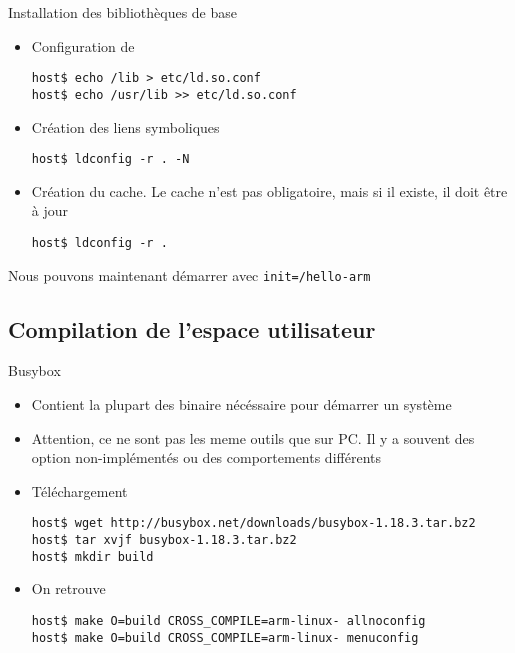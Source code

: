 \begin{frame}[fragile=singleslide]{Installation des bibliothèques de base}
  \begin{itemize}
  \item Configuration de 
    \begin{lstlisting}
host$ echo /lib > etc/ld.so.conf
host$ echo /usr/lib >> etc/ld.so.conf
    \end{lstlisting}
  \item Création des liens symboliques
    \begin{lstlisting}
host$ ldconfig -r . -N
    \end{lstlisting}
  \item Création du cache. Le  cache n'est pas obligatoire, mais si il
    existe, il doit être à jour
    \begin{lstlisting}
host$ ldconfig -r .
    \end{lstlisting}
  \end{itemize}
  Nous pouvons maintenant démarrer avec \verb+init=/hello-arm+
\end{frame}

\subsection{Compilation de l'espace utilisateur}

\begin{frame}[fragile=singleslide]{Busybox}
  \begin{itemize}
  \item  Contient la plupart  des binaire  nécéssaire pour  démarrer un
    système
  \item Attention, ce ne  sont pas les meme outils que sur  PC. Il y a
    souvent des option non-implémentés ou des comportements différents
  \item Téléchargement
    \begin{lstlisting}
host$ wget http://busybox.net/downloads/busybox-1.18.3.tar.bz2
host$ tar xvjf busybox-1.18.3.tar.bz2
host$ mkdir build
    \end{lstlisting}
  \item On retrouve 
    \begin{lstlisting}
host$ make O=build CROSS_COMPILE=arm-linux- allnoconfig
host$ make O=build CROSS_COMPILE=arm-linux- menuconfig
    \end{lstlisting}
  \end{itemize}
\end{frame}

